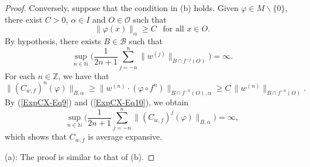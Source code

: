 \documentclass[10pt,a4paper]{amsart}
\newcommand{\N}{\mathbb{N}} %
\newcommand{\Z}{\mathbb{Z}} %
\newcommand{\cB}{\mathcal{B}}
\newcommand{\cO}{\mathcal{O}}
\begin{document}
\begin{proof}
Conversely, suppose that the condition in (b) holds.
Given $\varphi \in M \backslash \{0\}$, there exist $C > 0$, $\alpha \in I$ and $O \in \cO$ such that
\[
\|\varphi(x)\|_\alpha \geq C \ \ \text{ for all } x \in O.
\]
By hypothesis, there exists $B \in \cB$ such that
\begin{equation}\label{ExpCX-Eq9}
\sup_{n \in \N} \Big(\frac{1}{2n+1} \sum_{j=-n}^n \|w^{(j)}\|_{B \cap f^{-j}(O)}\Big) = \infty.
\end{equation}
For each $n \in \Z$, we have that
\begin{equation}\label{ExpCX-Eq10}
\|(C_{w,f})^n(\varphi)\|_{B,\alpha} \geq \|w^{(n)} \cdot (\varphi \circ f^n)\|_{B \cap f^{-n}(O),\alpha} 
  \geq C\, \|w^{(n)}\|_{B \cap f^{-n}(O)}.
\end{equation}
By (\ref{ExpCX-Eq9}) and (\ref{ExpCX-Eq10}), we obtain
\[
\sup_{n \in \N} \Big(\frac{1}{2n+1} \sum_{j=-n}^n \|(C_{w,f})^j(\varphi)\|_{B,\alpha}\Big) = \infty,
\]
which shows that $C_{w,f}$ is average expansive. 

\smallskip\noindent
(a): The proof is similar to that of (b).
\end{proof}
\end{document}
